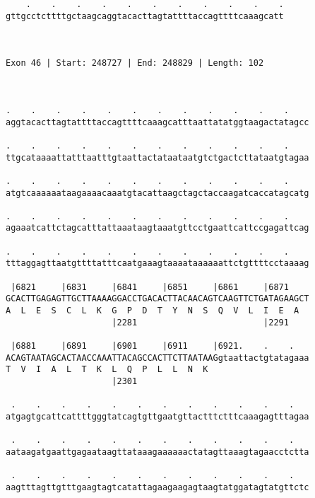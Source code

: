 \documentclass{article}
\begin{document}
\begin{Verbatim}
    .    .    .    .    .    .    .    .    .    .    .
gttgcctcttttgctaagcaggtacacttagtattttaccagttttcaaagcatt
                                                       
                                                       
 
Exon 46 | Start: 248727 | End: 248829 | Length: 102



.    .    .    .    .    .    .    .    .    .    .    .    
aggtacacttagtattttaccagttttcaaagcatttaattatatggtaagactatagcc
                                                            
.    .    .    .    .    .    .    .    .    .    .    .    
ttgcataaaattatttaatttgtaattactataataatgtctgactcttataatgtagaa
                                                            
.    .    .    .    .    .    .    .    .    .    .    .    
atgtcaaaaaataagaaaacaaatgtacattaagctagctaccaagatcaccatagcatg
                                                            
.    .    .    .    .    .    .    .    .    .    .    .    
agaaatcattctagcatttattaaataagtaaatgttcctgaattcattccgagattcag
                                                            
.    .    .    .    .    .    .    .    .    .    .    .    
tttaggagttaatgttttatttcaatgaaagtaaaataaaaaattctgttttcctaaaag
                                                            
 |6821     |6831     |6841     |6851     |6861     |6871    
GCACTTGAGAGTTGCTTAAAAGGACCTGACACTTACAACAGTCAAGTTCTGATAGAAGCT
A  L  E  S  C  L  K  G  P  D  T  Y  N  S  Q  V  L  I  E  A  
                     |2281                         |2291    
  
 |6881     |6891     |6901     |6911     |6921.    .    .   
ACAGTAATAGCACTAACCAAATTACAGCCACTTCTTAATAAGgtaattactgtatagaaa
T  V  I  A  L  T  K  L  Q  P  L  L  N  K                    
                     |2301                                  
  
 .    .    .    .    .    .    .    .    .    .    .    .   
atgagtgcattcattttgggtatcagtgttgaatgttactttctttcaaagagtttagaa
                                                            
 .    .    .    .    .    .    .    .    .    .    .    .   
aataagatgaattgagaataagttataaagaaaaaactatagttaaagtagaacctctta
                                                            
 .    .    .    .    .    .    .    .    .    .    .    .   
aagtttagttgtttgaagtagtcatattagaagaagagtaagtatggatagtatgttctc
                                                            

\end{Verbatim}
\end{document}
